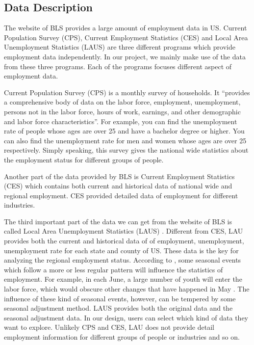 \documentclass{sigchi}
\begin{document}
\subsection{Data Description}
The website of BLS \cite{Labor_data} provides a large amount of employment data in US. Current Population Survey (CPS), Current Employment Statistics (CES) and Local Area Unemployment Statistics (LAUS) are three different programs which provide employment data independently. In our project, we mainly make use of the data from these three programs. Each of the programs focuses different aspect of employment data.

Current Population Survey (CPS) \cite{CPS} is a monthly survey of households. It ``provides a comprehensive body of data on the labor force, employment, unemployment, persons not in the labor force, hours of work, earnings, and other demographic and labor force characteristics''. For example, you can find the unemployment rate of people whose ages are over 25 and have a bachelor degree or higher. You can also find the unemployment rate for men and women whose ages are over 25 respectively. Simply speaking, this survey gives the national wide statistics about the employment status for different groups of people.

Another part of the data provided by BLS is Current Employment Statistics (CES) \cite{CES_data} which contains both current and historical data of national wide and regional employment. CES provided detailed data of employment for different industries.

The third important part of the data we can get from the website of BLS is called Local Area Unemployment Statistics (LAUS) \cite{LAUS_data}. Different from CES, LAU provides both the current and historical data of of employment, unemployment, unemployment rate for each state and county of US. These data is the key for analyzing the regional employment status. According to \cite{report}, some seasonal events which follow a more or less regular pattern will influence the statistics of employment. For example, in each June, a large number of youth will enter the labor force, which would obscure other changes that have happened in May \cite{report}. The influence of these kind of seasonal events, however, can be tempered by some seasonal adjustment method. LAUS provides both the original data and the seasonal adjustment data. In our design, users can select which kind of data they want to explore. Unlikely CPS and CES, LAU does not provide detail employment information for different groups of people or industries and so on.
\end{document}
